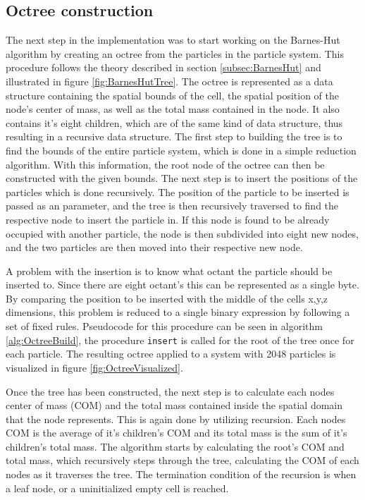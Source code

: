\subsection{Octree construction} \label{subsec:OctreeConstruction}
The next step in the implementation was to start working on the Barnes-Hut algorithm by creating an octree from the particles in the particle system. This procedure follows the theory described in section \ref{subsec:BarnesHut} and illustrated in figure \ref{fig:BarnesHutTree}. The octree is represented as a data structure containing the spatial bounds of the cell, the spatial position of the node's center of mass, as well as the total mass contained in the node. It also contains it's eight children, which are of the same kind of data structure, thus resulting in a recursive data structure. The first step to building the tree is to find the bounds of the entire particle system, which is done in a simple reduction algorithm. With this information, the root node of the octree can then be constructed with the given bounds. The next step is to insert the positions of the particles which is done recursively. The position of the particle to be inserted is passed as an parameter, and the tree is then recursively traversed to find the respective node to insert the particle in. If this node is found to be already occupied with another particle, the node is then subdivided into eight new nodes, and the two particles are then moved into their respective new node. 

A problem with the insertion is to know what octant the particle should be inserted to. Since there are eight octant's this can be represented as a single byte. By comparing the position to be inserted with the middle of the cells x,y,z dimensions, this problem is reduced to a single binary expression by following a set of fixed rules. Pseudocode for this procedure can be seen in algorithm \ref{alg:OctreeBuild}, the procedure \lstinline{insert} is called for the root of the tree once for each particle. The resulting octree applied to a system with 2048 particles is visualized in figure \ref{fig:OctreeVisualized}.

Once the tree has been constructed, the next step is to calculate each nodes center of mass (COM) and the total mass contained inside the spatial domain that the node represents. This is again done by utilizing recursion. Each nodes COM is the average of it's children's COM and its total mass is the sum of it's children's total mass. The algorithm starts by calculating the root's COM and total mass, which recursively steps through the tree, calculating the COM of each nodes as it traverses the tree. The termination condition of the recursion is when a leaf node, or a uninitialized empty cell is reached.

